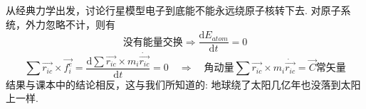 \vspace{-1em}
从经典力学出发，讨论行星模型电子到底能不能永远绕原子核转下去. 对原子系统，外力忽略不计，则有
\[
\textrm{没有能量交换}\Longrightarrow\frac{\textrm{d}E_{atom}}{\textrm{d}t}=0
\]
\[
\sum
\overrightarrow{r_{ic}}\times\overrightarrow{f_i^e}=\frac{\textrm{d}\sum\overrightarrow{r_{ic}}\times
m_i\dot{\overrightarrow{r_{ic}}} }{\textrm{d}t}=0
\quad \Longrightarrow\quad
\textrm{角动量}\sum\overrightarrow{r_{ic}}\times
m_{i}\dot{\overrightarrow{r_{ic}}}=\overrightarrow{C}\textrm{常矢量}
\]
结果与课本中的结论相反，这与我们所知道的: 地球绕了太阳几亿年也没落到太阳上一样. 
